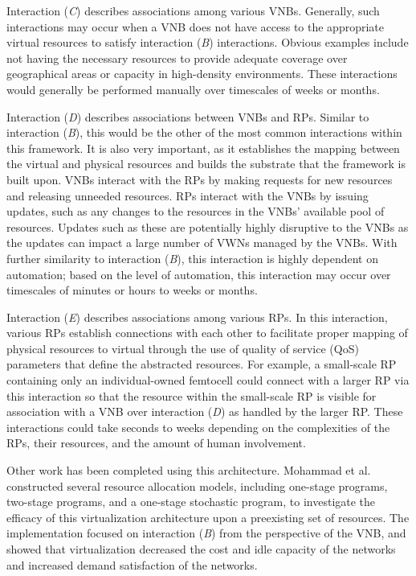 \documentclass[12pt,dvipsnames]{report}
\begin{document}
Interaction (\emph{C}) describes associations among various VNBs.  Generally, such interactions may occur when a VNB does not have access to the appropriate virtual resources to satisfy interaction (\emph{B}) interactions.  Obvious examples include not having the necessary resources to provide adequate coverage over geographical areas or capacity in high-density environments.  These interactions would generally be performed manually over timescales of weeks or months.

Interaction (\emph{D}) describes associations between VNBs and RPs.  Similar to interaction (\emph{B}), this would be the other of the most common interactions within this framework.  It is also very important, as it establishes the mapping between the virtual and physical resources and builds the substrate that the framework is built upon.  VNBs interact with the RPs by making requests for new resources and releasing unneeded resources.  RPs interact with the VNBs by issuing updates, such as any changes to the resources in the VNBs' available pool of resources.  Updates such as these are potentially highly disruptive to the VNBs as the updates can impact a large number of VWNs managed by the VNBs.  With further similarity to interaction (\emph{B}), this interaction is highly dependent on automation; based on the level of automation, this interaction may occur over timescales of minutes or hours to weeks or months.

Interaction (\emph{E}) describes associations among various RPs.  In this interaction, various RPs establish connections with each other to facilitate proper mapping of physical resources to virtual through the use of quality of service (QoS) parameters that define the abstracted resources.  For example, a small-scale RP containing only an individual-owned femtocell could connect with a larger RP via this interaction so that the resource within the small-scale RP is visible for association with a VNB over interaction (\emph{D}) as handled by the larger RP.  These interactions could take seconds to weeks depending on the complexities of the RPs, their resources, and the amount of human involvement.

Other work has been completed using this architecture.  Mohammad et al.~\cite{MJ_CCNC_16} constructed several resource allocation models, including one-stage programs, two-stage programs, and a one-stage stochastic program, to investigate the efficacy of this virtualization architecture upon a preexisting set of resources.  The implementation focused on interaction (\emph{B}) from the perspective of the VNB, and showed that virtualization decreased the cost and idle capacity of the networks and increased demand satisfaction of the networks.
\end{document}
